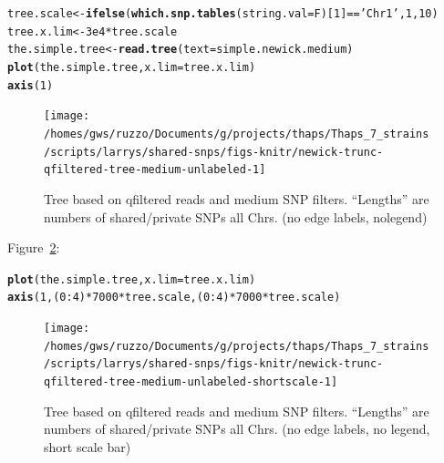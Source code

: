 \documentclass{article}\usepackage[]{graphicx}\usepackage[]{color}
\makeatletter
\newcommand{\hlnum}[1]{\textcolor[rgb]{0.686,0.059,0.569}{#1}}%
\newcommand{\hlstr}[1]{\textcolor[rgb]{0.192,0.494,0.8}{#1}}%
\newcommand{\hlopt}[1]{\textcolor[rgb]{0,0,0}{#1}}%
\newcommand{\hlstd}[1]{\textcolor[rgb]{0.345,0.345,0.345}{#1}}%
\newcommand{\hlkwb}[1]{\textcolor[rgb]{0.69,0.353,0.396}{#1}}%
\newcommand{\hlkwc}[1]{\textcolor[rgb]{0.333,0.667,0.333}{#1}}%
\newcommand{\hlkwd}[1]{\textcolor[rgb]{0.737,0.353,0.396}{\textbf{#1}}}%
\newenvironment{kframe}{%
 \def\at@end@of@kframe{}%
 \ifinner\ifhmode%
  \def\at@end@of@kframe{\end{minipage}}%
  \begin{minipage}{\columnwidth}%
 \fi\fi%
 \def\FrameCommand##1{\hskip\@totalleftmargin \hskip-\fboxsep
 \colorbox{shadecolor}{##1}\hskip-\fboxsep
     \hskip-\linewidth \hskip-\@totalleftmargin \hskip\columnwidth}%
 \MakeFramed {\advance\hsize-\width
   \@totalleftmargin\z@ \linewidth\hsize
   \@setminipage}}%
 {\par\unskip\endMakeFramed%
 \at@end@of@kframe}
\newenvironment{knitrout}{}{} %
\makeatother
\begin{document}
\begin{knitrout}\scriptsize
{}\color{fgcolor}\begin{kframe}
\begin{alltt}
\hlstd{tree.scale} \hlkwb{<-} \hlkwd{ifelse}\hlstd{(}\hlkwd{which.snp.tables}\hlstd{(}\hlkwc{string.val}\hlstd{=F)[}\hlnum{1}\hlstd{]}\hlopt{==}\hlstr{'Chr1'}\hlstd{,} \hlnum{1}\hlstd{,} \hlnum{10}\hlstd{)}
\hlstd{tree.x.lim} \hlkwb{<-} \hlnum{3e4} \hlopt{*} \hlstd{tree.scale}
\hlstd{the.simple.tree} \hlkwb{<-} \hlkwd{read.tree}\hlstd{(}\hlkwc{text}\hlstd{=simple.newick.medium)}
\hlkwd{plot}\hlstd{(the.simple.tree,} \hlkwc{x.lim} \hlstd{= tree.x.lim)}
\hlkwd{axis}\hlstd{(}\hlnum{1}\hlstd{)}
\end{alltt}
\end{kframe}\begin{figure}

{\centering \texttt{[image: /homes/gws/ruzzo/Documents/g/projects/thaps/Thaps\_7\_strains/scripts/larrys/shared-snps/figs-knitr/newick-trunc-qfiltered-tree-medium-unlabeled-1]} 

}

\caption[Tree based on qfiltered reads and medium SNP filters]{Tree based on qfiltered reads and medium SNP filters.  ``Lengths'' are numbers of shared/private SNPs all Chrs. (no edge labels, nolegend)}\label{fig:tree-medium-unlabeled}
\end{figure}


\end{knitrout}

Figure~\ref{fig:tree-medium-unlabeled-shortscale}:

\begin{knitrout}\scriptsize
{}\color{fgcolor}\begin{kframe}
\begin{alltt}
\hlkwd{plot}\hlstd{(the.simple.tree,} \hlkwc{x.lim} \hlstd{= tree.x.lim)}
\hlkwd{axis}\hlstd{(}\hlnum{1}\hlstd{,(}\hlnum{0}\hlopt{:}\hlnum{4}\hlstd{)}\hlopt{*}\hlnum{7000}\hlopt{*}\hlstd{tree.scale,(}\hlnum{0}\hlopt{:}\hlnum{4}\hlstd{)}\hlopt{*}\hlnum{7000}\hlopt{*}\hlstd{tree.scale)}
\end{alltt}
\end{kframe}\begin{figure}

{\centering \texttt{[image: /homes/gws/ruzzo/Documents/g/projects/thaps/Thaps\_7\_strains/scripts/larrys/shared-snps/figs-knitr/newick-trunc-qfiltered-tree-medium-unlabeled-shortscale-1]} 

}

\caption[Tree based on qfiltered reads and medium SNP filters]{Tree based on qfiltered reads and medium SNP filters.  ``Lengths'' are numbers of shared/private SNPs all Chrs. (no edge labels, no legend, short scale bar)}\label{fig:tree-medium-unlabeled-shortscale}
\end{figure}


\end{knitrout}
\end{document}
